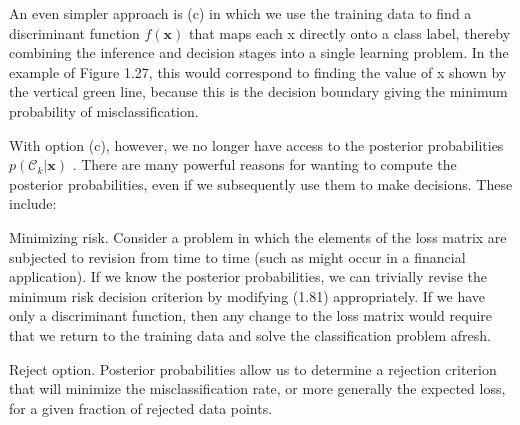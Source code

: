 \documentclass[
  10
]{article}
\begin{document}
An even simpler approach is (c) in which we use the training data to
find a discriminant function \(f ( \mathbf { x } )\) that maps each x
directly onto a class label, thereby combining the inference and
decision stages into a single learning problem. In the example of Figure
1.27, this would correspond to finding the value of x shown by the
vertical green line, because this is the decision boundary giving the
minimum probability of misclassification.

With option (c), however, we no longer have access to the posterior
probabilities \(p ( \mathcal { C } _ { k } \vert \mathbf { x } )\) .
There are many powerful reasons for wanting to compute the posterior
probabilities, even if we subsequently use them to make decisions. These
include:

Minimizing risk. Consider a problem in which the elements of the loss
matrix are subjected to revision from time to time (such as might occur
in a financial application). If we know the posterior probabilities, we
can trivially revise the minimum risk decision criterion by modifying
(1.81) appropriately. If we have only a discriminant function, then any
change to the loss matrix would require that we return to the training
data and solve the classification problem afresh.

Reject option. Posterior probabilities allow us to determine a rejection
criterion that will minimize the misclassification rate, or more
generally the expected loss, for a given fraction of rejected data
points.
\end{document}

